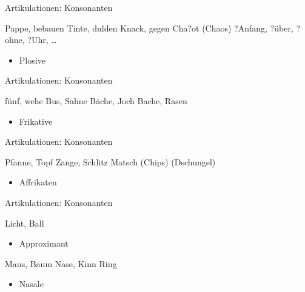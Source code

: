 \begin{frame}
  {Artikulationen: Konsonanten}
  \pause
  \begin{exe}
    \ex \alert{P}a\alert{pp}e, \alert{b}e\alert{b}auen
    \pause
    \ex \alert{T}in\alert{t}e, \alert{d}ul\alert{d}en
    \pause
    \ex \alert{K}na\alert{ck}, \alert{g}e\alert{g}en
    \pause
    \ex Cha\alert{?}ot (Chaos)
    \ex \alert{?}Anfang, \alert{?}über, \alert{?}ohne, \alert{?}Uhr, \dots
  \end{exe}
    \pause
    \Large
    \begin{itemize}
      \item \alert{Plosive}
    \end{itemize}
\end{frame}


\begin{frame}
  {Artikulationen: Konsonanten}
  \pause
  \begin{exe}
    \ex \alert{f}ün\alert{f}, \alert{w}ehe
    \pause
    \ex Bu\alert{s}, \alert{S}ahne
    \pause
    \ex Bä\alert{ch}e, \alert{J}och
    \pause
    \ex Ba\alert{ch}e, \alert{R}asen
  \end{exe}
    \pause
    \Large
    \begin{itemize}
      \item \alert{Frikative}
    \end{itemize}
\end{frame}

\begin{frame}
  {Artikulationen: Konsonanten}
  \pause
  \begin{exe}
    \ex \alert{Pf}anne, To\alert{pf} 
    \pause
    \ex \alert{Z}ange, Schli\alert{tz}
    \pause
    \ex Ma\alert{tsch} (\alert{Ch}ips)
    \pause
    \ex (\alert{Dsch}ungel)
  \end{exe}
    \pause
    \Large
    \begin{itemize}
      \item \alert{Affrikaten}
    \end{itemize}
\end{frame}

\begin{frame}
  {Artikulationen: Konsonanten}
  \pause
  \begin{exe}
    \ex \alert{L}icht, Ba\alert{ll}
  \end{exe}
    \pause
    \Large
    \begin{itemize}
      \item \alert{Approximant}
    \end{itemize}
    \Zeile
  \pause
  \begin{exe}
    \ex \alert{M}aus, Bau\alert{m}
    \pause
    \ex \alert{N}ase, Ki\alert{nn}
    \pause
    \ex Ri\alert{ng}
  \end{exe}
    \pause
    \Large
    \begin{itemize}
      \item \alert{Nasale}
    \end{itemize}
\end{frame}


